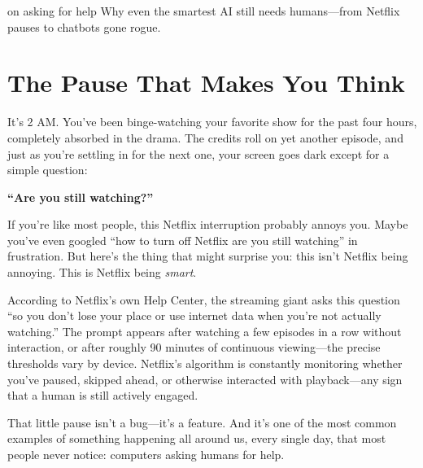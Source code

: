
\label{chap:ch01}
\begin{chapterquote}{on asking for help}
Why even the smartest AI still needs humans---from Netflix pauses to chatbots gone rogue.
\end{chapterquote}

\section{The Pause That Makes You Think}

It's 2 AM. You've been binge-watching your favorite show for the past four hours, completely absorbed in the drama. The credits roll on yet another episode, and just as you're settling in for the next one, your screen goes dark except for a simple question:

\begin{center}
\textbf{``Are you still watching?''}
\end{center}

If you're like most people, this Netflix interruption probably annoys you. Maybe you've even googled ``how to turn off Netflix are you still watching'' in frustration. But here's the thing that might surprise you: this isn't Netflix being annoying. This is Netflix being \emph{smart}.

According to Netflix's own Help Center, the streaming giant asks this question ``so you don't lose your place or use internet data when you're not actually watching.'' The prompt appears after watching a few episodes in a row without interaction, or after roughly 90 minutes of continuous viewing---the precise thresholds vary by device. Netflix's algorithm is constantly monitoring whether you've paused, skipped ahead, or otherwise interacted with playback---any sign that a human is still actively engaged.

That little pause isn't a bug---it's a feature. And it's one of the most common examples of something happening all around us, every single day, that most people never notice: computers asking humans for help.


